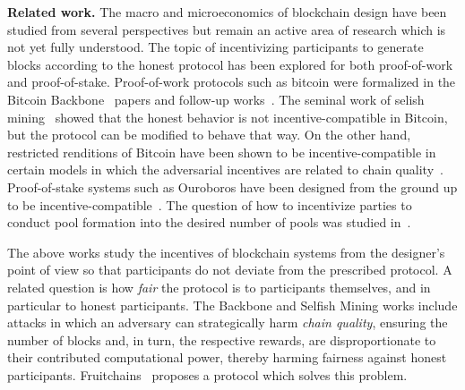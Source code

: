 \noindent
\textbf{Related work.}
The macro and microeconomics of blockchain design have
been studied from several perspectives but remain an active area of research
which is not yet fully understood. The topic of incentivizing participants to
generate blocks according to the honest protocol has been explored for both
proof-of-work and proof-of-stake. Proof-of-work protocols such as bitcoin were
formalized in the Bitcoin Backbone~\cite{backbone1,backbone2} papers and
follow-up works~\cite{pass}. The seminal work of selish mining~\cite{selfish}
showed that the honest behavior is not incentive-compatible in Bitcoin, but the
protocol can be modified to behave that way. On the other hand, restricted
renditions of Bitcoin have been shown to be incentive-compatible in certain
models in which the adversarial incentives are related to chain
quality~\cite{tselekounis-kiayias}. Proof-of-stake systems such as Ouroboros
have been designed from the ground up to be
incentive-compatible~\cite{ouroboros}. The question of how to incentivize
parties to conduct pool formation into the desired number of pools was studied
in~\cite{stouka-koutsoupias-kiayias}.

The above works study the incentives of blockchain systems from the designer's
point of view so that participants do not deviate from the prescribed protocol.
A related question is how \emph{fair} the protocol is to participants
themselves, and in particular to honest participants. The Backbone and Selfish
Mining works include attacks in which an adversary can strategically harm
\emph{chain quality}, ensuring the number of blocks and, in turn, the respective
rewards, are disproportionate to their contributed computational power, thereby
harming fairness against honest participants. Fruitchains~\cite{fruitchains}
proposes a protocol which solves this problem.

